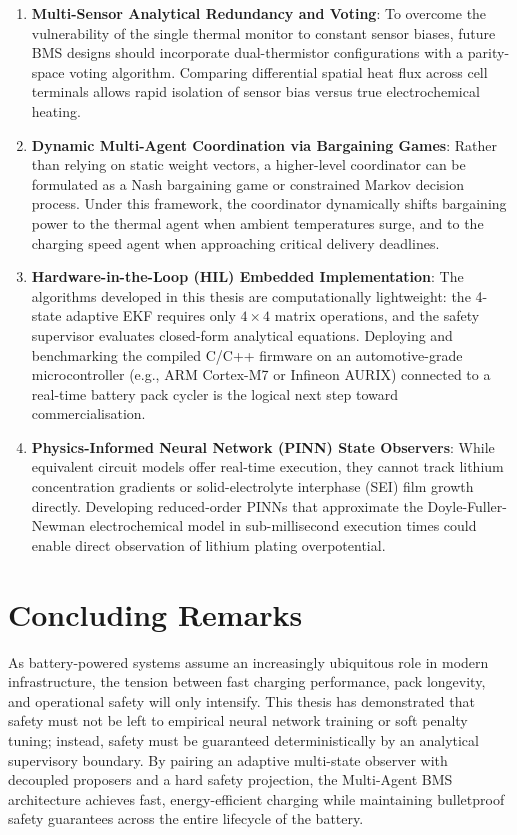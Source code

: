 \begin{enumerate}
  \item \textbf{Multi-Sensor Analytical Redundancy and Voting}:
  To overcome the vulnerability of the single thermal monitor to constant
  sensor biases, future BMS designs should incorporate dual-thermistor
  configurations with a parity-space voting algorithm. Comparing differential
  spatial heat flux across cell terminals allows rapid isolation of sensor
  bias versus true electrochemical heating.

  \item \textbf{Dynamic Multi-Agent Coordination via Bargaining Games}:
  Rather than relying on static weight vectors, a higher-level coordinator
  can be formulated as a Nash bargaining game or constrained Markov decision
  process. Under this framework, the coordinator dynamically shifts bargaining
  power to the thermal agent when ambient temperatures surge, and to the
  charging speed agent when approaching critical delivery deadlines.

  \item \textbf{Hardware-in-the-Loop (HIL) Embedded Implementation}:
  The algorithms developed in this thesis are computationally lightweight:
  the 4-state adaptive EKF requires only $4 \times 4$ matrix operations,
  and the safety supervisor evaluates closed-form analytical equations.
  Deploying and benchmarking the compiled C/C++ firmware on an automotive-grade
  microcontroller (e.g., ARM Cortex-M7 or Infineon AURIX) connected to a
  real-time battery pack cycler is the logical next step toward commercialisation.

  \item \textbf{Physics-Informed Neural Network (PINN) State Observers}:
  While equivalent circuit models offer real-time execution, they cannot
  track lithium concentration gradients or solid-electrolyte interphase (SEI)
  film growth directly. Developing reduced-order PINNs that approximate the
  Doyle-Fuller-Newman electrochemical model in sub-millisecond execution times
  could enable direct observation of lithium plating overpotential.
\end{enumerate}

\section{Concluding Remarks}

As battery-powered systems assume an increasingly ubiquitous role in modern
infrastructure, the tension between fast charging performance, pack longevity,
and operational safety will only intensify. This thesis has demonstrated
that safety must not be left to empirical neural network training or soft
penalty tuning; instead, safety must be guaranteed deterministically by an
analytical supervisory boundary. By pairing an adaptive multi-state observer
with decoupled proposers and a hard safety projection, the Multi-Agent BMS
architecture achieves fast, energy-efficient charging while maintaining
bulletproof safety guarantees across the entire lifecycle of the battery.
